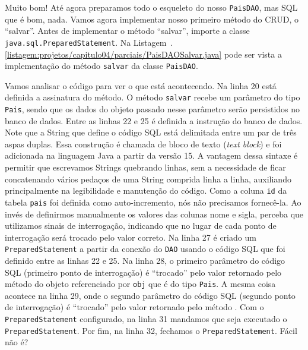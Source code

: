 
Muito bom! Até agora preparamos todo o esqueleto do nosso \texttt{PaisDAO}, mas SQL que é bom, nada. Vamos agora implementar nosso primeiro método do CRUD, o ``salvar''. Antes de implementar o método ``salvar'', importe a classe \texttt{java.sql.PreparedStatement}. Na Listagem~\thechapter.\ref{listagem:projetos/capitulo04/parciais/PaisDAOSalvar.java} pode ser vista a implementação do método \texttt{salvar} da classe \texttt{PaisDAO}.


Vamos analisar o código para ver o que está acontecendo. Na linha 20 está definida a assinatura do método. O método \texttt{salvar} recebe um parâmetro do tipo \texttt{Pais}, sendo que os dados do objeto passado nesse parâmetro serão persistidos no banco de dados. Entre as linhas 22 e 25 é definida a instrução  do banco de dados. Note que a String que define o código SQL está delimitada entre um par de três aspas duplas. Essa construção é chamada de bloco de texto (\textit{text block}) e foi adicionada na linguagem Java a partir da versão 15. A vantagem dessa sintaxe é permitir que escrevamos Strings quebrando linhas, sem a necessidade de ficar concatenando vários pedaços de uma String comprida linha a linha, auxiliando principalmente na legibilidade e manutenção do código. Como a coluna \texttt{id} da tabela \texttt{pais} foi definida como auto-incremento, nós não precisamos fornecê-la. Ao invés de definirmos manualmente os valores das colunas nome e sigla, perceba que utilizamos sinais de interrogação, indicando que no lugar de cada ponto de interrogação será trocado pelo valor correto. Na linha 27 é criado um \texttt{PreparedStatement} a partir da conexão do \texttt{DAO} usando o código SQL que foi definido entre as linhas 22 e 25. Na linha 28, o primeiro parâmetro do código SQL (primeiro ponto de interrogação) é ``trocado'' pelo valor retornado pelo método  do objeto referenciado por \texttt{obj} que é do tipo \texttt{Pais}. A mesma coisa acontece na linha 29, onde o segundo parâmetro do código SQL (segundo ponto de interrogação) é ``trocado'' pelo valor retornado pelo método . Com o \texttt{PreparedStatement} configurado, na linha 31 mandamos que seja executado o \texttt{PreparedStatement}. Por fim, na linha 32, fechamos o \texttt{PreparedStatement}. Fácil não é?

